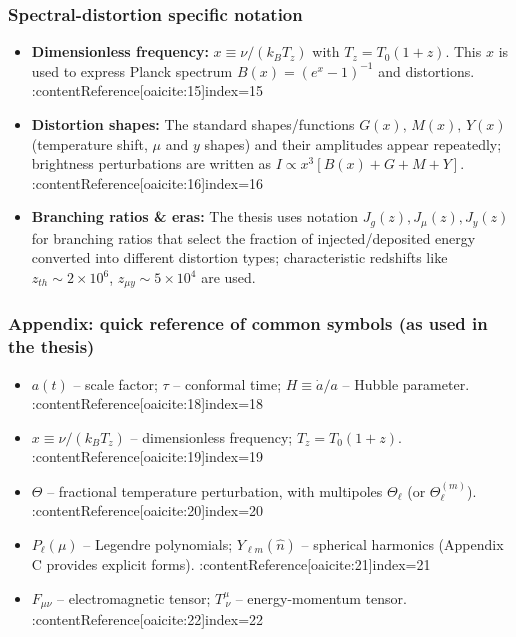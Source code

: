 \subsubsection{Spectral-distortion specific notation}
\begin{itemize}
  \item \textbf{Dimensionless frequency:} $x\equiv \nu/(k_B T_z)$ with $T_z=T_0(1+z)$. This $x$ is used to express Planck spectrum $B(x)=(e^x-1)^{-1}$ and distortions. :contentReference[oaicite:15]{index=15}
  \item \textbf{Distortion shapes:} The standard shapes/functions $G(x),\,M(x),\,Y(x)$ (temperature shift, $\mu$ and $y$ shapes) and their amplitudes appear repeatedly; brightness perturbations are written as $I\propto x^3[B(x)+G+M+Y]$. :contentReference[oaicite:16]{index=16}
  \item \textbf{Branching ratios \& eras:} The thesis uses notation $J_g(z),J_\mu(z),J_y(z)$ for branching ratios that select the fraction of injected/deposited energy converted into different distortion types; characteristic redshifts like $z_{ th}\sim 2\times10^6$, $z_{\mu y}\sim 5\times10^4$ are used. 
\end{itemize}

\subsubsection*{Appendix: quick reference of common symbols (as used in the thesis)}
\begin{itemize}
  \item $a(t)$ -- scale factor; $\tau$ -- conformal time; $H\equiv\dot a/a$ -- Hubble parameter. :contentReference[oaicite:18]{index=18}
  \item $x\equiv \nu/(k_B T_z)$ -- dimensionless frequency; $T_z=T_0(1+z)$. :contentReference[oaicite:19]{index=19}
  \item $\Theta$ -- fractional temperature perturbation, with multipoles $\Theta_\ell$ (or $\Theta_\ell^{(m)}$). :contentReference[oaicite:20]{index=20}
  \item $P_\ell(\mu)$ -- Legendre polynomials; $Y_{\ell m}(\hat n)$ -- spherical harmonics (Appendix C provides explicit forms). :contentReference[oaicite:21]{index=21}
  \item $F_{\mu\nu}$ -- electromagnetic tensor; $T^\mu_{\ \nu}$ -- energy-momentum tensor. :contentReference[oaicite:22]{index=22}
\end{itemize}
